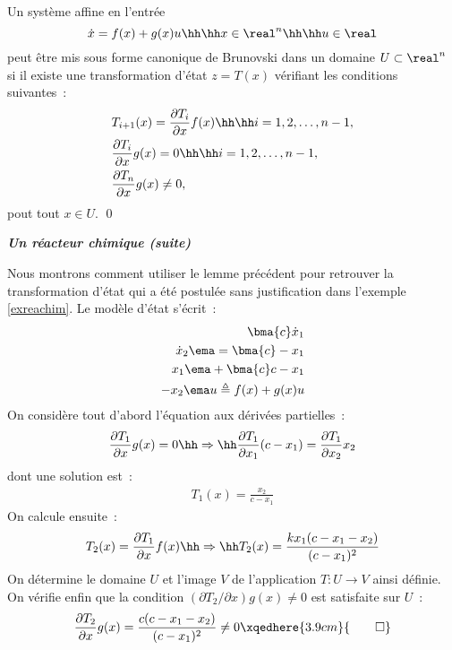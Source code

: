 \begin{lemme}{\blanc}
Un système affine en l'entrée
$$
\dot x = f(x) + g(x)u \hh \hh x \in \real^n \hh \hh u \in \real
$$
peut être mis sous forme canonique de Brunovski dans un domaine $U \subset \real^n$ si il existe une transformation d'état $z = T(x)$ vérifiant les conditions suivantes~:
\begin{equation*} \begin{split} 
& T_{i+1}(x) = \frac{\partial T_i}{\partial x}f(x) \hh \hh i=1,2, \ldots, n-1, \\
& \frac{\partial T_i}{\partial x}g(x) = 0 \hh \hh i=1,2, \ldots, n-1, \\
& \frac{\partial T_n}{\partial x}g(x) \neq 0,
\end{split} \end{equation*}
pout tout $x \in U$. \qed
\end{lemme}
\vv

\begin{exemple}{\bf \em Un réacteur chimique (suite)}

Nous montrons comment utiliser le lemme précédent pour retrouver la transformation d'état qui a été postulée sans justification dans l'exemple \ref{exreachim}. Le modèle d'état s'écrit~:
\begin{equation*} \begin{split}
\bma{c} \dot x_1 \\ \dot x_2 \ema = \bma{c} -x_1 \\ x_1 \ema + \bma{c} c-x_1 \\ -x_2 \ema u \triangleq f(x) + g(x)u
\end{split} \end{equation*}
On considère tout d'abord l'équation aux dérivées partielles~:
\begin{equation*} \begin{split}
\frac{\partial T_1}{\partial x}g(x)=0 \hh \Rightarrow \hh \frac{\partial T_1}{\partial x_1}(c-x_1) = \frac{\partial T_1}{\partial x_2}x_2
\end{split} \end{equation*}
dont une solution est~:
\begin{equation*} \begin{split}
T_1(x) = \frac{x_2}{c-x_1}
\end{split} \end{equation*}
On calcule ensuite~:
\begin{equation*} \begin{split}
T_2(x) = \frac{\partial T_1}{\partial x}f(x) \hh \Rightarrow \hh T_2(x) = \frac{kx_1(c-x_1-x_2)}{(c-x_1)^2}
\end{split} \end{equation*}
On détermine le domaine $U$ et l'image $V$ de l'application $T:U \rightarrow V$ ainsi définie. On vérifie enfin que la condition $(\partial T_2/\partial x)g(x) \neq 0$ est satisfaite sur $U$~:
\begin{equation*} \begin{split}
\frac{\partial T_2}{\partial x}g(x) = \frac{c(c-x_1-x_2)}{(c-x_1)^2} \neq 0 \xqedhere{3.9cm}{\qed}
\end{split} \end{equation*}
\end{exemple}

